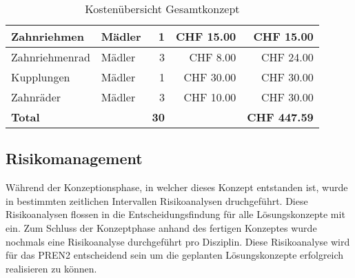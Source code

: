 \documentclass[../../main.tex]{subfiles}
\begin{document}
\begin{table}[H]
\begin{tabular}{|p{6cm}|l|r|r|r|}
    Zahnriehmen                                             & Mädler             & 1               & CHF 15.00           & CHF 15.00             \\ \hline \nocite{MadlerZahnriemen}
    Zahnriehmenrad                                          & Mädler             & 3               & CHF 8.00            & CHF 24.00             \\ \hline \nocite{MadlerZahnriemenrad}
    Kupplungen                                              & Mädler             & 1               & CHF 30.00           & CHF 30.00             \\ \hline \nocite{MadlerKupplung}
    Zahnräder                                               & Mädler             & 3               & CHF 10.00           & CHF 30.00             \\ \hline \hline \nocite{MadlerZahnrad}
    \textbf{Total}                                          & \textbf{}          & \textbf{30}     & \textbf{}           & \textbf{CHF 447.59}   \\ \hline
    \end{tabular}
    \caption{Kostenübersicht Gesamtkonzept}
    \label{tab:kosten_total}
    \end{table}

\pagebreak

\subsection{Risikomanagement}
Während der Konzeptionsphase, in welcher dieses Konzept entstanden ist, wurde in bestimmten zeitlichen Intervallen Risikoanalysen druchgeführt. Diese Risikoanalysen flossen in die Entscheidungsfindung für alle Lösungskonzepte mit ein. Zum Schluss der Konzeptphase anhand des fertigen Konzeptes wurde nochmals eine Risikoanalyse durchgeführt pro Disziplin. Diese Risikoanalyse wird für das PREN2 entscheidend sein um die geplanten Lösungskonzepte erfolgreich realisieren zu können.
\end{document}
